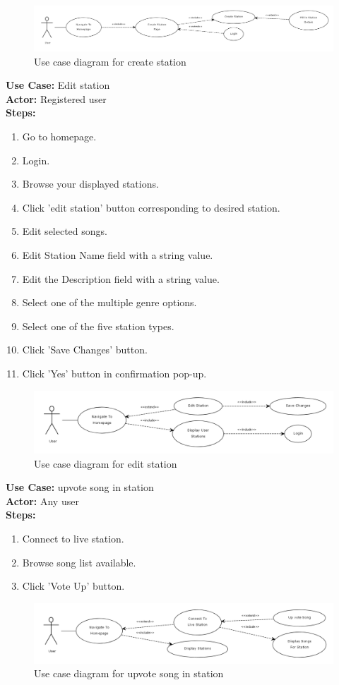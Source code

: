 \documentclass[a4paper, 12pt]{report}
\begin{document}
\begin{figure}[!htbp]
  \centering
    \includegraphics[width=1.0\textwidth]{usecase2.png}
    \caption{Use case diagram for create station}
\end{figure}
\textbf{Use Case:} Edit station\\
\textbf{Actor:} Registered user\\
\textbf{Steps:} 
\begin{enumerate}
\item Go to homepage.
\item Login.
\item Browse your displayed stations.
\item Click 'edit station' button corresponding to desired station.
\item Edit selected songs.
\item Edit Station Name field with a string value.
\item Edit the Description field with a string value.
\item Select one of the multiple genre options.
\item Select one of the five station types.
\item Click 'Save Changes' button.
\item Click 'Yes' button in confirmation pop-up.
\end{enumerate}
\begin{figure}[!htbp]
  \centering
    \includegraphics[width=1.0\textwidth]{usecase3.png}
    \caption{Use case diagram for edit station}
\end{figure}
\textbf{Use Case:} upvote song in station\\
\textbf{Actor:} Any user\\
\textbf{Steps:} 
\begin{enumerate}
\item Connect to live station.
\item Browse song list available.
\item Click 'Vote Up' button.
\end{enumerate}
\begin{figure}[!htbp]
  \centering
    \includegraphics[width=1.0\textwidth]{usecase4.png}
    \caption{Use case diagram for upvote song in station }
\end{figure}
\end{document}
